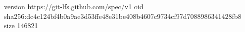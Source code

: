 version https://git-lfs.github.com/spec/v1
oid sha256:dc4c124bf4b0a9ae3d53ffe48e31be408b4607c9734cf97d7088986341428fb8
size 146821
